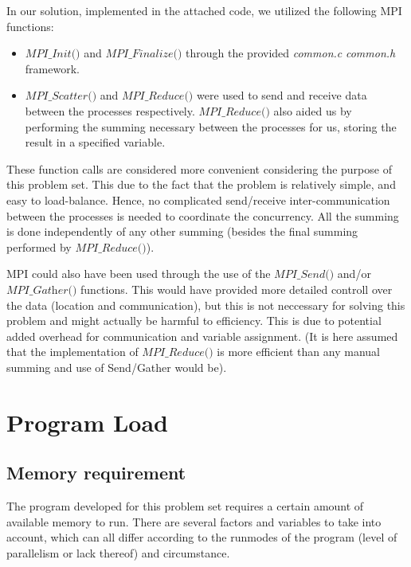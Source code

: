 \documentclass[fontsize=11pt,paper=a4,titlepage]{report}
\begin{document}
In our solution, implemented in the attached code, we utilized the following MPI
functions:
\begin{itemize}
	\item{$\textit{MPI\_Init()}$ and $\textit{
MPI\_Finalize()}$ through the provided \textit{common.c} \textit{common.h}
framework.}
	\item{$\textit{MPI\_Scatter()}$ and $\textit{MPI\_Reduce()}$ were used to
send and receive data between the processes respectively.
$\textit{MPI\_Reduce()}$ also aided us by performing the summing necessary
between the processes for us, storing the result in a specified variable.}
\end{itemize}

These function calls are considered more convenient considering the purpose of
this problem set. This due to the fact that the problem is relatively simple,
and easy to load-balance. Hence, no complicated send/receive inter-communication
between the processes is needed to coordinate the concurrency. All the summing
is done independently of any other summing (besides the final summing performed
by $\textit{MPI\_Reduce()}$).

MPI could also have been used through the use of the $\textit{MPI\_Send()}$
and/or $\textit{MPI\_Gather()}$ functions. This would have provided more
detailed controll over the data (location and communication), but this is not
neccessary for solving this problem and might actually be harmful to efficiency.
This is due to potential added overhead for communication and variable
assignment. (It is here assumed that the implementation of
$\textit{MPI\_Reduce()}$ is more efficient than any manual summing and use of
Send/Gather would be).


\section{Program Load}

\subsection{Memory requirement}
\label{subsec:MemReq}

The program developed for this problem set requires a certain amount of
available memory to run. There are several factors and variables to take into
account, which can all differ according to the runmodes of the program (level of
parallelism or lack thereof) and circumstance.
\end{document}
